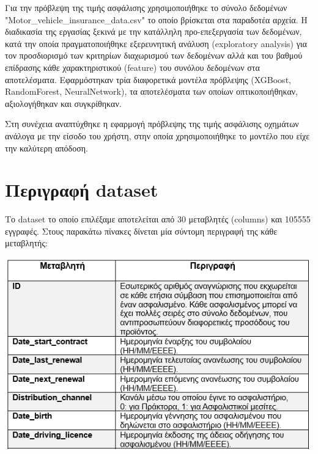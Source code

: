 \documentclass{llncs}
\begin{document}
Για την πρόβλεψη της τιμής ασφάλισης χρησιμοποιήθηκε το σύνολο δεδομένων \\"Motor\_vehicle\_insurance\_data.csv" το οποίο βρίσκεται στα παραδοτέα αρχεία. Η διαδικασία της εργασίας ξεκινά με την κατάλληλη προ-επεξεργασία 
των δεδομένων, κατά την οποία πραγματοποιήθηκε εξερευνητική ανάλυση (exploratory analysis) για τον προσδιορισμό των κριτηρίων διαχωρισμού των δεδομένων αλλά και του βαθμού επίδρασης κάθε χαρακτηριστικού (feature) 
του συνόλου δεδομένων στα αποτελέσματα. Εφαρμόστηκαν τρία διαφορετικά μοντέλα πρόβλεψης (XGBoost, RandomForest, NeuralNetwork), τα αποτελέσματα των οποίων οπτικοποιήθηκαν, αξιολογήθηκαν και συγκρίθηκαν. 

Στη συνέχεια αναπτύχθηκε η εφαρμογή πρόβλεψης της τιμής ασφάλισης οχημάτων ανάλογα με την είσοδο του χρήστη, στην οποία χρησιμοποιήθηκε το μοντέλο που είχε την καλύτερη απόδοση.   


\section{Περιγραφή dataset}
Το dataset το οποίο επιλέξαμε αποτελείται από 30 μεταβλητές (columns) και 105555 εγγραφές. Στους παρακάτω πίνακες δίνεται μία σύντομη περιγραφή της κάθε μεταβλητής:

\begin{center}
    \includegraphics[width=1\textwidth]{images/variables_1.png}
\end{center}
\end{document}
